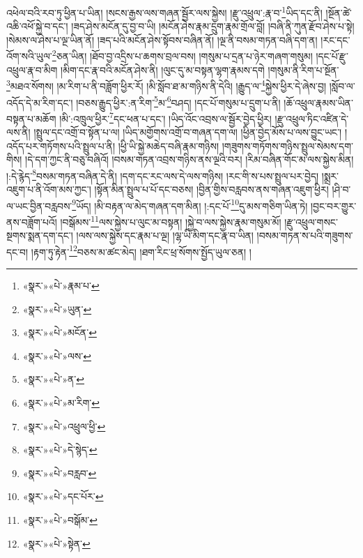 འཕེལ་བའི་རབ་ཏུ་ཕྱིན་པ་ཡིན། །སངས་རྒྱས་ལས་གཞན་སྦྱོར་ལས་སྐྱེས། །རྫུ་འཕྲུལ་:རྣ་བ་\footnote{«སྣར་»«པེ་»རྣམ་པ་}ཡིད་དང་ནི། །སྔོན་ཚེ་འཆི་འཕོ་སྐྱེ་བ་དང་། །ཟད་ཤེས་མངོན་དུ་བྱ་བ་ཡི། །མངོན་ཤེས་རྣམ་དྲུག་རྣམ་གྲོལ་བློ། །བཞི་ནི་ཀུན་རྫོབ་ཤེས་པ་སྟེ། །སེམས་ལ་ཤེས་པ་ལྔ་ཡིན་ནོ། །ཟད་པའི་མངོན་ཤེས་སྟོབས་བཞིན་ནོ། །ལྔ་ནི་བསམ་གཏན་བཞི་དག་ན། །རང་དང་འོག་སའི་ཡུལ་\footnote{«སྣར་»«པེ་»ཡུན་}ཅན་ཡིན། །ཐོབ་བྱ་འདྲིས་པ་ཆགས་བྲལ་བས། །གསུམ་པ་དྲན་པ་ཉེར་གཞག་གསུམ། །དང་པོ་རྫུ་འཕྲུལ་རྣ་བ་མིག །མིག་དང་རྣ་བའི་མངོན་ཤེས་ནི། །ལུང་དུ་མ་བསྟན་ལྷག་རྣམས་དགེ །གསུམ་ནི་རིག་པ་སྔོན་\footnote{«སྣར་»«པེ་»མངོན་}མཐའ་སོགས། །མ་རིག་པ་ནི་བཟློག་ཕྱིར་རོ། །མི་སློབ་ཐ་མ་གཉིས་ནི་དེའི། །རྒྱུད་ལ་\footnote{«སྣར་»«པེ་»ལས་}སྐྱེས་ཕྱིར་དེ་ཞེས་བྱ། །སློབ་ལ་འདོད་དེ་མ་རིག་དང་། །བཅས་རྒྱུད་ཕྱིར་:ན་རིག་\footnote{«སྣར་»«པེ་»ན་}མ་\footnote{«སྣར་»«པེ་»མ་རིག་}བཤད། །དང་པོ་གསུམ་པ་དྲུག་པ་ནི། །ཆོ་འཕྲུལ་རྣམས་ཡིན་བསྟན་པ་མཆོག །མི་:འཁྲུལ་ཕྱིར་\footnote{«སྣར་»«པེ་»འཕྲུལ་ཕྱི་}དང་ཕན་པ་དང་། །ཡིད་འོང་འབྲས་ལ་སྦྱོར་བྱེད་ཕྱིར། །རྫུ་འཕྲུལ་ཏིང་འཛིན་དེ་ལས་ནི། །སྤྲུལ་དང་འགྲོ་བ་སྟོན་པ་ལ། །ཡིད་མགྱོགས་འགྲོ་བ་གཞན་དག་ལ། །ཕྱིན་བྱེད་མོས་པ་ལས་བྱུང་ཡང་། །འདོད་པར་གཏོགས་པའི་སྤྲུལ་པ་ནི། །ཕྱི་ཡི་སྐྱེ་མཆེད་བཞི་རྣམ་གཉིས། །གཟུགས་གཏོགས་གཉིས་སྤྲུལ་སེམས་དག་གིས། །དེ་དག་ཀྱང་ནི་བཅུ་བཞིའོ། །བསམ་གཏན་འབྲས་གཉིས་ནས་ལྔའི་བར། །རིམ་བཞིན་གོང་མ་ལས་སྐྱེས་མིན། །:དེ་རྙེད་\footnote{«སྣར་»«པེ་»དེ་སྙེད་}བསམ་གཏན་བཞིན་དེ་ནི། །དག་དང་རང་ལས་དེ་ལས་གཉིས། །རང་གི་ས་པས་སྤྲུལ་པར་བྱེད། །སྨྲར་འཇུག་པ་ནི་འོག་མས་ཀྱང་། །སྟོན་མིན་སྤྲུལ་པ་པོ་དང་བཅས། །བྱིན་གྱིས་བརླབས་ནས་གཞན་འཇུག་ཕྱིར། །ཤི་བ་ལ་ཡང་བྱིན་བརླབས་\footnote{«སྣར་»«པེ་»བརླབ་}ཡོད། །མི་བརྟན་ལ་མེད་གཞན་དག་མིན། །:དང་པོ་\footnote{«སྣར་»«པེ་»དང་པོར་}དུ་མས་གཅིག་ཡིན་ཏེ། །བྱང་བར་གྱུར་ནས་བཟློག་པའོ། །བསྒོམས་\footnote{«སྣར་»«པེ་»བསྒོམ་}ལས་སྐྱེས་པ་ལུང་མ་བསྟན། །སྐྱེ་བ་ལས་སྐྱེས་རྣམ་གསུམ་མོ། །རྫུ་འཕྲུལ་གསང་སྔགས་སྨན་དག་དང་། །ལས་ལས་སྐྱེས་དང་རྣམ་པ་ལྔ། །ལྷ་ཡི་མིག་དང་རྣ་བ་ཡིན། །བསམ་གཏན་ས་པའི་གཟུགས་དང་བ། །རྟག་ཏུ་རྟེན་\footnote{«སྣར་»«པེ་»སྟེན་}བཅས་མ་ཚང་མེད། །ཐག་རིང་ཕྲ་སོགས་སྤྱོད་ཡུལ་ཅན། །
